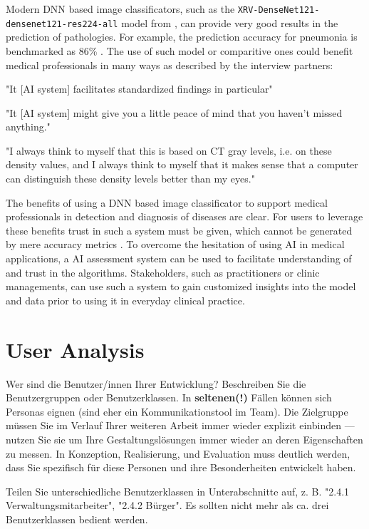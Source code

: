 \documentclass[11pt,a4paper,english]{scrreprt}
\newenvironment{comment}
  {\par\medskip
   \begingroup\color{olive}%
   }
 {\endgroup
  \medskip}
\begin{document}
Modern DNN based image classificators, such as the \texttt{XRV\--DenseNet121\--densenet121\--res224\--all} model from \textcite{cohen_limits_2020}, can provide very good results in the prediction of pathologies. For example, the prediction accuracy for pneumonia is benchmarked as 86\% \parencite{torchxrayvision_github}. The use of such model or comparitive ones could benefit medical professionals in many ways as described by the interview partners:
\begin{displayquote}
    "It [AI system] facilitates standardized findings in particular"
\end{displayquote}
\begin{displayquote}
    "It [AI system] might give you a little peace of mind that you haven't missed anything."
\end{displayquote}
\begin{displayquote}
    "I always think to myself that this is based on CT gray levels, i.e. on these density values, and I always think to myself that it makes sense that a computer can distinguish these density levels better than my eyes."
\end{displayquote}

The benefits of using a DNN based image classificator to support medical professionals in detection and diagnosis of diseases are clear. For users to leverage these benefits trust in such a system must be given, which cannot be generated by mere accuracy metrics \parencite{samek_explaining_2021}. To overcome the hesitation of using AI in medical applications, a AI assessment system can be used to facilitate understanding of and trust in the algorithms. Stakeholders, such as practitioners or clinic managements, can use such a system to gain customized insights into the model and data prior to using it in everyday clinical practice.

\section{User Analysis}
\begin{comment}
Wer sind die Benutzer/innen Ihrer Entwicklung? Beschreiben Sie die Benutzergruppen oder Benutzerklassen. In \textbf{seltenen(!)} Fällen können sich Personas eignen (sind eher ein Kommunikationstool im Team). Die Zielgruppe müssen Sie im Verlauf Ihrer weiteren Arbeit immer wieder explizit einbinden — nutzen Sie sie um Ihre Gestaltungslösungen immer wieder an deren Eigenschaften zu messen. In Konzeption, Realisierung, und Evaluation muss deutlich werden, dass Sie spezifisch für diese Personen und ihre Besonderheiten entwickelt haben.

Teilen Sie unterschiedliche Benutzerklassen in Unterabschnitte auf, z. B. "2.4.1 Verwaltungsmitarbeiter", "2.4.2 Bürger". Es sollten nicht mehr als ca. drei Benutzerklassen bedient werden.
\end{comment}
\end{document}
